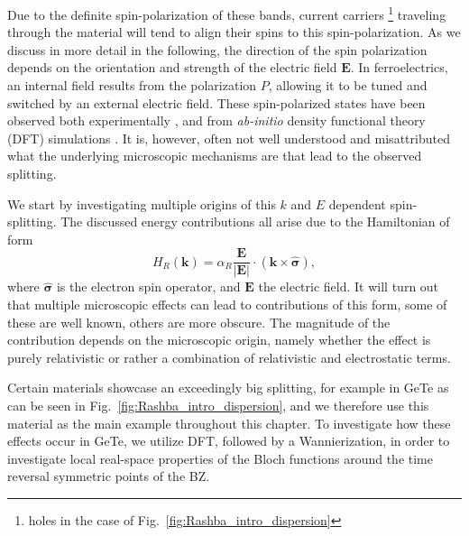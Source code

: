 Due to the definite spin-polarization of these bands, current carriers \footnote{holes in the case of Fig.~\ref{fig:Rashba_intro_dispersion}} traveling through the material will tend to align their spins to this spin-polarization.
As we discuss in more detail in the following, the direction of the spin polarization depends on the orientation and strength of the electric field $\mathbf{E}$. In ferroelectrics, an internal field results from the polarization $P$, allowing it to be tuned and switched by an external electric field.
These spin-polarized states have been observed both experimentally \cite{Ishizaka2011,Liebmann2016,Krempasky2015SurfaceSemiconductor}, and from {\it ab-initio} density functional theory (DFT) simulations \cite{DiSante2013}.
It is, however, often not well understood and misattributed what the underlying microscopic mechanisms are that lead to the observed splitting.

We start by investigating multiple origins of this $k$ and $E$ dependent spin-splitting. The discussed energy contributions all arise due to the Hamiltonian of form
\begin{equation}
	\label{eq:Rashba_form}
	H_R(\mathbf{k}) = \alpha_R \frac{\mathbf{E}}{|\mathbf{E}|} \cdot (\mathbf{k} \times \hat{\mathbf{\sigma}}),
\end{equation}
where $\hat{\mathbf{\sigma}}$ is the electron spin operator, and $\mathbf{E}$ the electric field.
It will turn out that multiple microscopic effects can lead to contributions of this form, some of these are well known, others are more obscure.
The magnitude of the contribution depends on the microscopic origin, namely whether the effect is purely relativistic or rather a combination of relativistic and electrostatic terms.

Certain materials showcase an exceedingly big splitting, for example in GeTe as can be seen in Fig.~\ref{fig:Rashba_intro_dispersion}, and we therefore use this material as the main example throughout this chapter.
To investigate how these effects occur in GeTe, we utilize DFT, followed by a Wannierization, in order to investigate local real-space properties of the Bloch functions around the time reversal symmetric points of the BZ.

